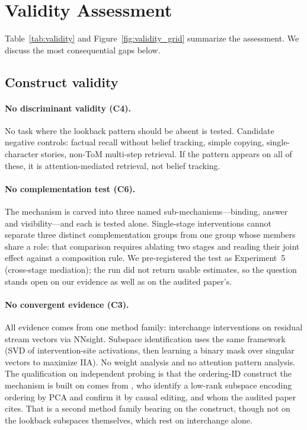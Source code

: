 \documentclass{article}
\begin{document}
\section{Validity Assessment}
\label{sec:validity}

Table~\ref{tab:validity} and Figure~\ref{fig:validity_grid} summarize the assessment. We discuss the most consequential gaps below.

\subsection{Construct validity}

\paragraph{No discriminant validity (C4).}
No task where the lookback pattern should be absent is tested. Candidate negative controls: factual recall without belief tracking, simple copying, single-character stories, non-ToM multi-step retrieval. If the pattern appears on all of these, it is attention-mediated retrieval, not belief tracking.

\paragraph{No complementation test (C6).}
The mechanism is carved into three named sub-mechanisms---binding, answer and
visibility---and each is tested alone. Single-stage interventions cannot separate three
distinct complementation groups from one group whose members share a role: that comparison
requires ablating two stages and reading their joint effect against a composition rule. We
pre-registered the test as Experiment~5 (cross-stage mediation); the run did not return
usable estimates, so the question stands open on our evidence as well as on the audited
paper's.

\paragraph{No convergent evidence (C3).}
All evidence comes from one method family: interchange interventions on residual stream vectors via NNsight. Subspace identification uses the same framework (SVD of intervention-site activations, then learning a binary mask over singular vectors to maximize IIA). No weight analysis and no attention pattern analysis. The qualification on independent
probing is that the ordering-ID construct the mechanism is built on comes from
\citet{dai2024representational}, who identify a low-rank subspace encoding ordering by PCA
and confirm it by causal editing, and whom the audited paper cites. That is a second method
family bearing on the construct, though not on the lookback subspaces themselves, which rest
on interchange alone.
\end{document}
